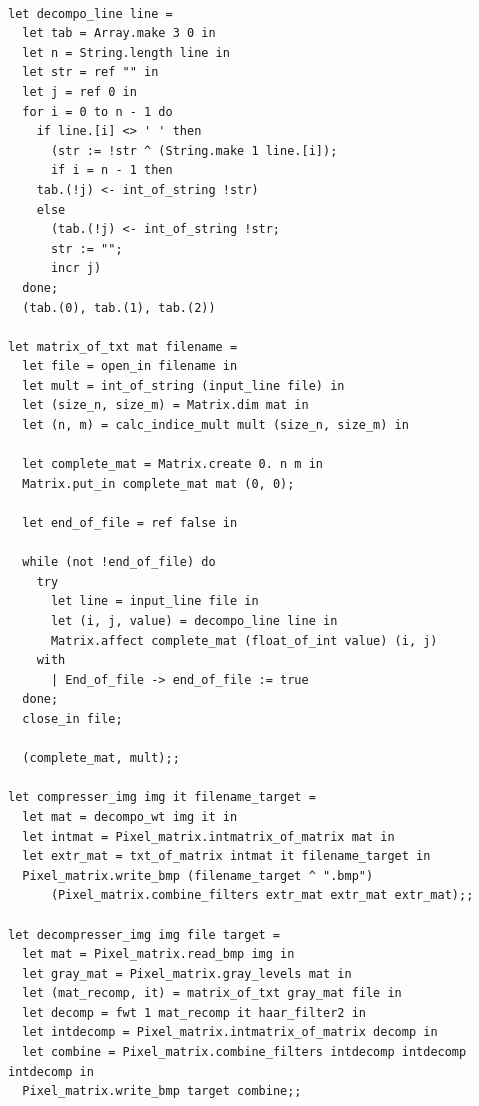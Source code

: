 \documentclass[a4paper,10pt]{report}
\theoremstyle{break}
\begin{document}
    \begin{lstlisting}

let decompo_line line =
  let tab = Array.make 3 0 in
  let n = String.length line in
  let str = ref "" in
  let j = ref 0 in
  for i = 0 to n - 1 do
    if line.[i] <> ' ' then
      (str := !str ^ (String.make 1 line.[i]);
      if i = n - 1 then
	tab.(!j) <- int_of_string !str)
    else
      (tab.(!j) <- int_of_string !str;
      str := "";
      incr j)
  done;
  (tab.(0), tab.(1), tab.(2)) 

let matrix_of_txt mat filename =
  let file = open_in filename in
  let mult = int_of_string (input_line file) in
  let (size_n, size_m) = Matrix.dim mat in
  let (n, m) = calc_indice_mult mult (size_n, size_m) in
  
  let complete_mat = Matrix.create 0. n m in
  Matrix.put_in complete_mat mat (0, 0); 
  
  let end_of_file = ref false in

  while (not !end_of_file) do
    try
      let line = input_line file in
      let (i, j, value) = decompo_line line in
      Matrix.affect complete_mat (float_of_int value) (i, j)
    with
      | End_of_file -> end_of_file := true
  done;
  close_in file;
  
  (complete_mat, mult);;

let compresser_img img it filename_target =
  let mat = decompo_wt img it in
  let intmat = Pixel_matrix.intmatrix_of_matrix mat in
  let extr_mat = txt_of_matrix intmat it filename_target in
  Pixel_matrix.write_bmp (filename_target ^ ".bmp") 
      (Pixel_matrix.combine_filters extr_mat extr_mat extr_mat);;

let decompresser_img img file target =
  let mat = Pixel_matrix.read_bmp img in
  let gray_mat = Pixel_matrix.gray_levels mat in
  let (mat_recomp, it) = matrix_of_txt gray_mat file in
  let decomp = fwt 1 mat_recomp it haar_filter2 in
  let intdecomp = Pixel_matrix.intmatrix_of_matrix decomp in
  let combine = Pixel_matrix.combine_filters intdecomp intdecomp intdecomp in
  Pixel_matrix.write_bmp target combine;;
	
    \end{lstlisting}
\newpage
\end{document}
